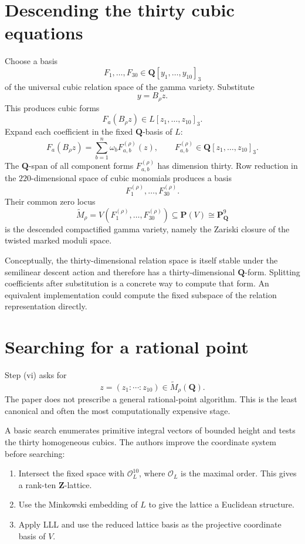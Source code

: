 \documentclass[11pt]{article}
\newcommand{\QQ}{\mathbf{Q}}
\newcommand{\ZZ}{\mathbf{Z}}
\newcommand{\PP}{\mathbf{P}}
\newcommand{\tM}{\widetilde{M}}
\begin{document}
\section{Descending the thirty cubic equations}

Choose a basis
\[
  F_1,\ldots,F_{30}\in\QQ[y_1,\ldots,y_{10}]_3
\]
of the universal cubic relation space of the gamma variety.  Substitute
\[
  y=B_{\rho}z.
\]
This produces cubic forms
\[
  F_a(B_{\rho}z)\in L[z_1,\ldots,z_{10}]_3.
\]
Expand each coefficient in the fixed $\QQ$-basis of $L$:
\[
  F_a(B_{\rho}z)
   =\sum_{b=1}^{n}\omega_bF_{a,b}^{(\rho)}(z),
  \qquad
  F_{a,b}^{(\rho)}\in\QQ[z_1,\ldots,z_{10}]_3.
\]
The $\QQ$-span of all component forms $F_{a,b}^{(\rho)}$ has dimension
thirty.  Row reduction in the $220$-dimensional space of cubic monomials
produces a basis
\[
  F_1^{(\rho)},\ldots,F_{30}^{(\rho)}.
\]
Their common zero locus
\[
  \tM_{\rho}
  =V(F_1^{(\rho)},\ldots,F_{30}^{(\rho)})
  \subseteq\PP(V)\cong\PP^9_{\QQ}
\]
is the descended compactified gamma variety, namely the Zariski closure of
the twisted marked moduli space.

Conceptually, the thirty-dimensional relation space is itself stable under
the semilinear descent action and therefore has a thirty-dimensional
$\QQ$-form.  Splitting coefficients after substitution is a concrete way to
compute that form.  An equivalent implementation could compute the fixed
subspace of the relation representation directly.

\section{Searching for a rational point}

Step (vi) asks for
\[
  z=(z_1:\cdots:z_{10})\in\tM_{\rho}(\QQ).
\]
The paper does not prescribe a general rational-point algorithm.  This is the
least canonical and often the most computationally expensive stage.

A basic search enumerates primitive integral vectors of bounded height and
tests the thirty homogeneous cubics.  The authors improve the coordinate
system before searching:

\begin{enumerate}
\item Intersect the fixed space with $\mathcal{O}_L^{10}$, where
$\mathcal{O}_L$ is the maximal order.  This gives a rank-ten $\ZZ$-lattice.
\item Use the Minkowski embedding of $L$ to give the lattice a Euclidean
structure.
\item Apply LLL and use the reduced lattice basis as the projective
coordinate basis of $V$.
\end{enumerate}
\end{document}
